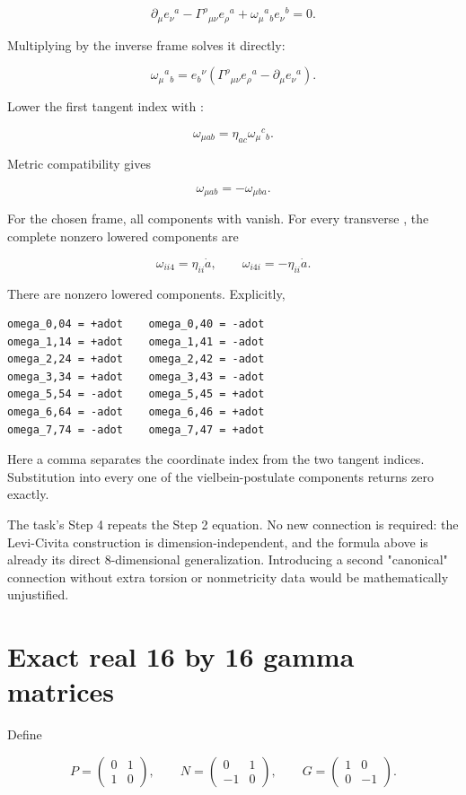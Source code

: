 \documentclass[11pt]{article}
\begin{document}
\[
\partial_\mu e_\nu{}^a
-\Gamma^\rho{}_{\mu\nu}e_\rho{}^a
+\omega_\mu{}^a{}_b e_\nu{}^b=0.
\]

Multiplying by the inverse frame solves it directly:

\[
\boxed{
\omega_\mu{}^a{}_b
=e_b{}^\nu\left(
\Gamma^\rho{}_{\mu\nu}e_\rho{}^a
-\partial_\mu e_\nu{}^a
\right).}
\]

Lower the first tangent index with \texttt{}:

\[
\omega_{\mu ab}=\eta_{ac}\omega_\mu{}^c{}_b.
\]

Metric compatibility gives

\[
\omega_{\mu ab}=-\omega_{\mu ba}.
\]

For the chosen frame, all components with \texttt{} vanish. For every transverse \texttt{}, the complete nonzero lowered components are

\[
\boxed{
\omega_{i i4}=\eta_{ii}\dot a,
\qquad
\omega_{i4i}=-\eta_{ii}\dot a.}
\]

There are \texttt{} nonzero lowered components. Explicitly,

\begin{Verbatim}[fontsize=\small]
omega_0,04 = +adot    omega_0,40 = -adot
omega_1,14 = +adot    omega_1,41 = -adot
omega_2,24 = +adot    omega_2,42 = -adot
omega_3,34 = +adot    omega_3,43 = -adot
omega_5,54 = -adot    omega_5,45 = +adot
omega_6,64 = -adot    omega_6,46 = +adot
omega_7,74 = -adot    omega_7,47 = +adot
\end{Verbatim}

Here a comma separates the coordinate index from the two tangent indices. Substitution into every one of the \texttt{} vielbein-postulate components returns zero exactly.

The task's Step 4 repeats the Step 2 equation. No new connection is required: the Levi-Civita construction is dimension-independent, and the formula above is already its direct 8-dimensional generalization. Introducing a second "canonical" connection without extra torsion or nonmetricity data would be mathematically unjustified.

\section{Exact real 16 by 16 gamma matrices}

Define

\[
P=\begin{pmatrix}0&1\\1&0\end{pmatrix},
\qquad
N=\begin{pmatrix}0&1\\-1&0\end{pmatrix},
\qquad
G=\begin{pmatrix}1&0\\0&-1\end{pmatrix}.
\]
\end{document}
